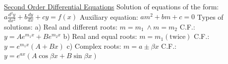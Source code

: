 \documentclass[12pt]{article}
\begin{document}
\begin{flushleft}
	\uline{Second Order Differential Equations} \linebreak 
	\textbullet \quad Solution of equations of the form: $\displaystyle a\frac{d^2y}{dx^2} + b\frac{dy}{dx} + cy = f(x) $ \linebreak 
	Auxiliary equation: $am^2 +bm +c = 0 $ \linebreak 
	Types of solutions: \linebreak 
	a) Real and different roots: $m=m_1 \ \land m=m_2$ \linebreak 
	C.F.: $y=Ae^{m_1x} + Be^{m_2x} $ \linebreak 
	b) Real and equal roots: $m = m_1 (\text{twice})$ \linebreak 
	C.F.: $y = e^{m_1x} (A+Bx)$ \linebreak 
	c) Complex roots: $m=a\pm \beta x$ \linebreak 
	C.F.: $y = e^{ax} (A\cos \beta x + B\sin \beta x) $ \linebreak 
	

\end{flushleft}
\end{document}
